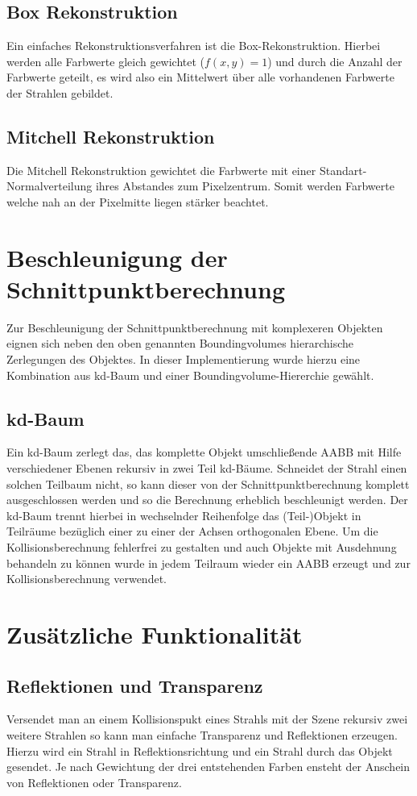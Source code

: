 \documentclass[a4paper]{article}
\begin{document}
\subsection*{Box Rekonstruktion}
Ein einfaches Rekonstruktionsverfahren ist die Box-Rekonstruktion. Hierbei werden alle Farbwerte gleich gewichtet ($f(x,y) = 1$) und durch die Anzahl der Farbwerte geteilt, es wird also ein Mittelwert über alle vorhandenen Farbwerte der Strahlen gebildet.

\subsection*{Mitchell Rekonstruktion}
Die Mitchell Rekonstruktion gewichtet die Farbwerte mit einer Standart-Normalverteilung ihres Abstandes zum Pixelzentrum. Somit werden Farbwerte welche nah an der Pixelmitte liegen stärker beachtet.

\section*{Beschleunigung der Schnittpunktberechnung}
Zur Beschleunigung der Schnittpunktberechnung mit komplexeren Objekten eignen sich neben den oben genannten Boundingvolumes hierarchische Zerlegungen des Objektes. In dieser Implementierung wurde hierzu eine Kombination aus kd-Baum und einer Boundingvolume-Hiererchie gewählt.

\subsection*{kd-Baum}
Ein kd-Baum zerlegt das, das komplette Objekt umschließende AABB mit Hilfe verschiedener Ebenen rekursiv in zwei Teil kd-Bäume. Schneidet der Strahl einen solchen Teilbaum nicht, so kann dieser von der Schnittpunktberechnung komplett ausgeschlossen werden und so die Berechnung erheblich beschleunigt werden. Der kd-Baum trennt hierbei in wechselnder Reihenfolge das (Teil-)Objekt in Teilräume bezüglich einer zu einer der Achsen orthogonalen Ebene. Um die Kollisionsberechnung fehlerfrei zu gestalten und auch Objekte mit Ausdehnung behandeln zu können wurde in jedem Teilraum wieder ein AABB erzeugt und zur Kollisionsberechnung verwendet.

\section*{Zusätzliche Funktionalität}
\subsection*{Reflektionen und Transparenz}
Versendet man an einem Kollisionspukt eines Strahls mit der Szene rekursiv zwei weitere Strahlen so kann man einfache Transparenz und Reflektionen erzeugen. Hierzu wird ein Strahl in Reflektionsrichtung und ein Strahl durch das Objekt gesendet. Je nach Gewichtung der drei entstehenden Farben ensteht der Anschein von Reflektionen oder Transparenz.
\end{document}
